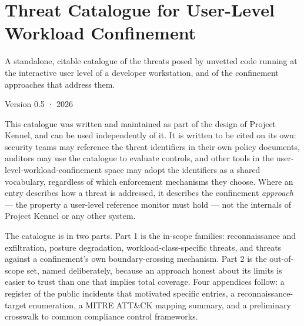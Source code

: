 \hypertarget{threat-catalogue-for-user-level-workload-confinement}{%
\section{Threat Catalogue for User-Level Workload
Confinement}\label{threat-catalogue-for-user-level-workload-confinement}}

A standalone, citable catalogue of the threats posed by unvetted code
running at the interactive user level of a developer workstation, and of
the confinement approaches that address them.

Version 0.5 · 2026

This catalogue was written and maintained as part of the design of
Project Kennel, and can be used independently of it. It is written to be
cited on its own: security teams may reference the threat identifiers in
their own policy documents, auditors may use the catalogue to evaluate
controls, and other tools in the user-level-workload-confinement space
may adopt the identifiers as a shared vocabulary, regardless of which
enforcement mechanisms they choose. Where an entry describes how a
threat is addressed, it describes the confinement \emph{approach} ---
the property a user-level reference monitor must hold --- not the
internals of Project Kennel or any other system.

The catalogue is in two parts. Part 1 is the in-scope families:
reconnaissance and exfiltration, posture degradation,
workload-class-specific threats, and threats against a confinement's own
boundary-crossing mechanism. Part 2 is the out-of-scope set, named
deliberately, because an approach honest about its limits is easier to
trust than one that implies total coverage. Four appendices follow: a
register of the public incidents that motivated specific entries, a
reconnaissance-target enumeration, a MITRE ATT\&CK mapping summary, and
a preliminary crosswalk to common compliance control frameworks.
